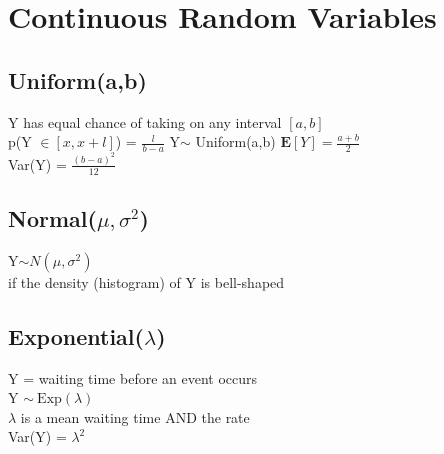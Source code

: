 \documentclass[]{article}
\begin{document}
\section{Continuous Random Variables}
\subsection*{Uniform(a,b)}
Y has equal chance of taking on any interval $[a,b]$\\
p(Y $\in [x, x+l]$) = $\frac{l}{b-a}$
Y$\sim$ Uniform(a,b)
$\mathbf{E}[Y] = \frac{a+b}{2}$\\
Var(Y) = $\frac{(b-a)^2}{12}$\\

\subsection*{Normal($\mu, \sigma^2$)}
Y$\sim N(\mu,\sigma^2)$\\
if the density (histogram) of Y is bell-shaped\\

\subsection*{Exponential($\lambda$)}
Y = waiting time before an event occurs\\
Y $\sim \ \text{Exp}(\lambda)$ \\
$\lambda$ is a mean waiting time AND the rate\\
Var(Y) = $\lambda^2$
\end{document}
